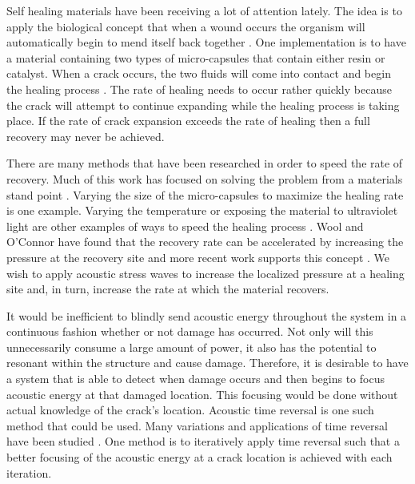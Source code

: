 \documentclass[a4paper]{spie}  %
\begin{document}
Self healing materials have been receiving a lot of attention lately. The idea is to apply the biological concept that when a wound occurs the organism will automatically begin to mend itself back together \cite{Scott2011}. One  implementation is to have a material containing two types of micro-capsules that contain either resin or catalyst. When a crack occurs, the two fluids will come into contact and begin the healing process \cite{Mangun2010, White2001, Yuan2008}. The rate of healing needs to occur rather quickly because the crack will attempt to continue expanding while the healing process is taking place. If the rate of crack expansion exceeds the rate of healing then a full recovery may never be achieved.

There are many methods that have been researched in order to speed the rate of recovery. Much of this work has focused on solving the problem from a materials stand point \cite{Sheng2009, Burattini2009, Nakao2009, Fettig2009, Imperiale2009, Zhang2007}. Varying the size of the micro-capsules to maximize the healing rate is one example\cite{Rule2007}. Varying the temperature or exposing the material to ultraviolet light are other examples of ways to speed the healing process \cite{Sloof2009, Song2009, Bosman2009, Djugum2009, Murphy2009, Garcia2009}. Wool and O'Connor have found that the recovery rate can be accelerated by increasing the pressure at the recovery site and more recent work supports this concept \cite{Wool1981, Sharma2011}. We wish to apply acoustic stress waves to increase the localized pressure at a healing site and, in turn, increase the rate at which the material recovers. 

It would be inefficient to blindly send acoustic energy throughout the system in a continuous fashion whether or not damage has occurred. Not only will this unnecessarily consume a large amount of power, it also has the potential to resonant within the structure and cause damage. Therefore, it is desirable to have a system that is able to detect when damage occurs and then begins to focus acoustic energy at that damaged location. This focusing would be done without actual knowledge of the crack's location. Acoustic time reversal is one such method that could be used. Many variations and applications of time reversal have been studied \cite{Anderson2008, Anderson2009, Ambrozinski2012, Borcea2003, Dahl2009, Fink2009, Foroozan2011, Harley2009, Sinelnikov2010, Sutin2004}. One method is to iteratively apply time reversal such that a better focusing of the acoustic energy at a crack location is achieved with each iteration.
\end{document}
